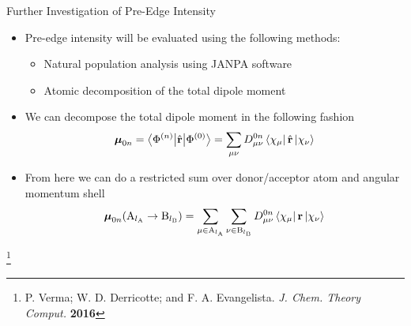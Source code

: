 \documentclass[t]{beamer}
\newcommand\blfootnote[1]{%
  \begingroup
  \renewcommand\thefootnote{}\footnote{#1}%
  \addtocounter{footnote}{-1}%
  \endgroup
}
\newcommand{\bra}[2][0]
{\ifthenelse{\equal{#1}{0}}{\left\langle #2 \right|}
{\ifthenelse{\equal{#1}{1}}{\big\langle #2 \big|}
{\ifthenelse{\equal{#1}{2}}{\Big\langle #2 \Big|}
{\ifthenelse{\equal{#1}{3}}{\bigg\langle #2 \bigg|}
{\ifthenelse{\equal{#1}{4}}{\Bigg\langle #2 \Bigg|}
{Error}}}}}
}
\newcommand{\ket}[2][0]
{\ifthenelse{\equal{#1}{0}}{\left| #2 \right\rangle}
{\ifthenelse{\equal{#1}{1}}{\big| #2 \big\rangle}
{\ifthenelse{\equal{#1}{2}}{\Big| #2 \Big\rangle}
{\ifthenelse{\equal{#1}{3}}{\bigg| #2 \bigg\rangle}
{\ifthenelse{\equal{#1}{4}}{\Bigg| #2 \Bigg\rangle}
{Error}}}}}
}
\begin{document}
\begin{frame}{Further Investigation of Pre-Edge Intensity}
\begin{itemize}
\item Pre-edge intensity will be evaluated using the following methods:
		\begin{itemize}
		\item Natural population analysis using JANPA software
		\item Atomic decomposition of the total dipole moment
		\end{itemize}
\item We can decompose the total dipole moment in the following fashion
\begin{equation}
\boldsymbol\mu_{0n} = \bra[1]{\Phi^{(n)}}\hat{\mathbf{r}} \ket[1]{\Phi^{(0)}} = \sum_{\mu\nu} D^{0n}_{\mu\nu} \bra{\chi_\mu} \hat{\mathbf{r}} \ket{\chi_\nu}
\end{equation}
\item From here we can do a restricted sum over donor/acceptor atom and angular momentum shell
\begin{equation}
\boldsymbol\mu_{0n} (\mathrm{A}_{l_\mathrm{A}} \rightarrow \mathrm{B}_{l_\mathrm{B}}) = \sum_{\mu \in \mathrm{A}_{l_\mathrm{A}}}\sum_{\nu \in \mathrm{B}_{l_\mathrm{B}}} D^{0n}_{\mu\nu} \bra{\chi_\mu} \mathbf{r} \ket{\chi_\nu}
\end{equation}
\end{itemize}
\blfootnote{P. Verma; W. D. Derricotte; and F. A. Evangelista. \textit{J. Chem. Theory Comput.} \textbf{2016}}
\end{frame}
\end{document}
